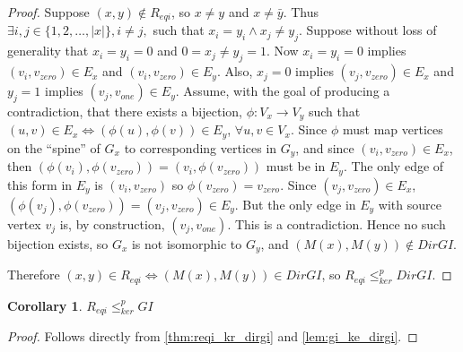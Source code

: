 \documentclass{article}
\newtheorem{corollary}{Corollary}%
\theoremstyle{definition}
\newcommand{\kr}{\leq^{p}_{ker}} %
\begin{document}
\begin{proof}
  Suppose $(x, y)\notin R_{eqi}$, so $x\neq y$ and $x\neq\bar{y}$. Thus
  $\exists i,j\in\{1,2,\ldots,|x|\}, i\neq j,$ such that $x_i=y_i\land x_j\neq
  y_j$. Suppose without loss of generality that $x_i=y_i=0$ and $0=x_j\neq
  y_j=1$. Now $x_i=y_i=0$ implies $(v_i, v_{zero})\in E_x$ and $(v_i,
  v_{zero})\in E_y$. Also, $x_j=0$ implies $(v_j, v_{zero})\in E_x$ and $y_j=1$
  implies $(v_j, v_{one})\in E_y$. Assume, with the goal of producing a
  contradiction, that there exists a bijection, $\phi:V_x\to V_y$ such that
  $(u,v)\in E_x\iff(\phi(u),\phi(v))\in E_y$, $\forall u,v\in V_x$. Since
  $\phi$ must map vertices on the ``spine'' of $G_x$ to corresponding vertices
  in $G_y$, and since $(v_i, v_{zero})\in E_x$, then $(\phi(v_i),
  \phi(v_{zero}))=(v_i, \phi(v_{zero}))$ must be in $E_y$. The only edge of
  this form in $E_y$ is $(v_i, v_{zero})$ so $\phi(v_{zero})=v_{zero}$. Since
  $(v_j, v_{zero})\in E_x$, $(\phi(v_j), \phi(v_{zero}))=(v_j, v_{zero})\in
  E_y$. But the only edge in $E_y$ with source vertex $v_j$ is, by
  construction, $(v_j, v_{one})$. This is a contradiction. Hence no such
  bijection exists, so $G_x$ is not isomorphic to $G_y$, and $(M(x),
  M(y))\notin DirGI$.

  Therefore $(x, y)\in R_{eqi} \iff (M(x), M(y))\in DirGI$, so $R_{eqi}\kr
  DirGI$.
\end{proof}

\begin{corollary}$R_{eqi}\kr GI$\end{corollary}
\begin{proof}Follows directly from \autoref{thm:reqi_kr_dirgi} and
  \autoref{lem:gi_ke_dirgi}.\end{proof}
\end{document}
